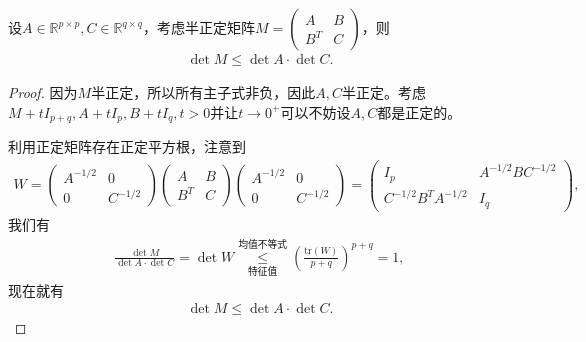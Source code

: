 \documentclass[../../main.tex]{subfiles}
\begin{document}
\begin{proposition}[Fischer不等式]\label{proposition:Fischer不等式}
设$A \in \mathbb{R}^{p \times p}, C \in \mathbb{R}^{q \times q}$，考虑半正定矩阵$M = \begin{pmatrix} A & B \\ B^T & C \end{pmatrix}$，则
\begin{align*}
\det M \leqslant \det A \cdot \det C.
\end{align*}
\end{proposition}
\begin{proof}
因为$M$半正定，所以所有主子式非负，因此$A,C$半正定。考虑$M + tI_{p+q}, A + tI_p, B + tI_q, t > 0$并让$t \to 0^+$可以不妨设$A,C$都是正定的。

利用正定矩阵存在正定平方根，注意到
\begin{align*}
W = \begin{pmatrix} A^{-1/2} & 0 \\ 0 & C^{-1/2} \end{pmatrix} \begin{pmatrix} A & B \\ B^T & C \end{pmatrix} \begin{pmatrix} A^{-1/2} & 0 \\ 0 & C^{-1/2} \end{pmatrix} = \begin{pmatrix} I_p & A^{-1/2}BC^{-1/2} \\ C^{-1/2}B^T A^{-1/2} & I_q \end{pmatrix},
\end{align*}
我们有
\begin{align*}
\frac{\det M}{\det A \cdot \det C} = \det W \overset{\text{均值不等式}}{\underset{\text{特征值}}{\leqslant}} \left( \frac{\text{tr}(W)}{p+q} \right)^{p+q} = 1,
\end{align*}
现在就有
\begin{align*}
\det M \leqslant \det A \cdot \det C.
\end{align*}

\end{proof}
\end{document}
